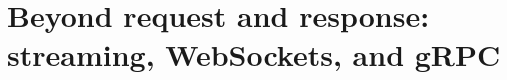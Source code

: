 \chapter{Beyond request and response: streaming, WebSockets, and gRPC}
\label{ch:beyond-request-and-response-streaming}

